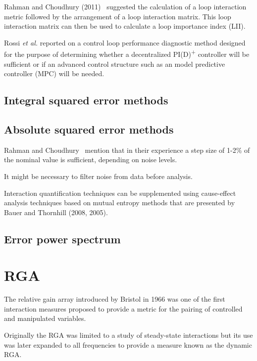 Rahman and Choudhury (2011)~\cite{Rahmann2011} %
suggested the calculation of a loop interaction metric followed by the arrangement of a loop interaction matrix.
This loop interaction matrix can then be used to calculate a loop importance index (LII).

Rossi \textit{et al.} reported on a control loop performance diagnostic method designed for the purpose of determining whether a decentralized PI(D)\textsuperscript{+} controller will be sufficient or if an advanced control structure such as an model predictive controller (MPC) will be needed.



\subsection{Integral squared error methods}



\subsection{Absolute squared error methods}

Rahman and Choudhury~\cite{Rahman2011} mention that in their experience a step size of 1-2\% of the nominal value is sufficient, depending on noise levels.

It might be necessary to filter noise from data before analysis.



Interaction quantification techniques can be supplemented using cause-effect analysis techniques based on mutual entropy methods that are presented by Bauer and Thornhill (2008, 2005).

\subsection{Error power spectrum}



\section{RGA}

The relative gain array introduced by Bristol in 1966 %
was one of the first interaction measures proposed to provide a metric for the pairing of controlled and manipulated variables.

Originally the RGA was limited to a study of steady-state interactions but its use was later expanded to all frequencies to provide a measure known as the dynamic RGA. %

